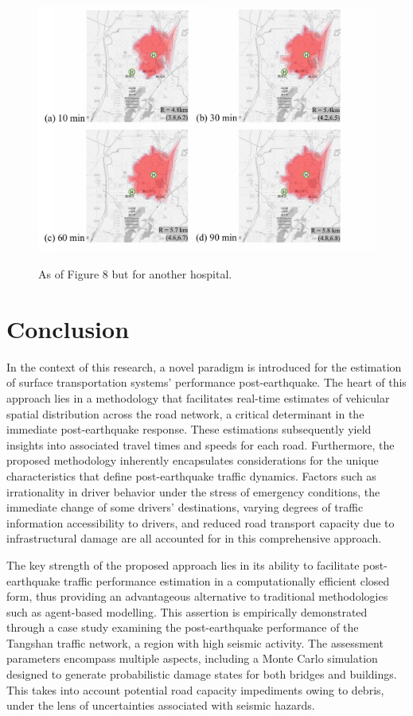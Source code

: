 \documentclass[review,11pt,nonatbib]{elsarticle}
\begin{document}
\begin{figure}[!htp]\centering
\includegraphics[width=12cm]{contour_hospital_2.pdf}\\
\caption{As of Figure 8 but for another hospital.}\label{fig9}
\end{figure}


\section{Conclusion}

In the context of this research, a novel paradigm is introduced for the estimation of surface transportation systems' performance post-earthquake. The heart of this approach lies in a methodology that facilitates real-time estimates of vehicular spatial distribution across the road network, a critical determinant in the immediate post-earthquake response. These estimations subsequently yield insights into associated travel times and speeds for each road. Furthermore, the proposed methodology inherently encapsulates considerations for the unique characteristics that define post-earthquake traffic dynamics. Factors such as irrationality in driver behavior under the stress of emergency conditions, the immediate change of some drivers' destinations, varying degrees of traffic information accessibility to drivers, and reduced road transport capacity due to infrastructural damage are all accounted for in this comprehensive approach.

The key strength of the proposed approach lies in its ability to facilitate post-earthquake traffic performance estimation in a computationally efficient closed form, thus providing an advantageous alternative to traditional methodologies such as agent-based modelling. This assertion is empirically demonstrated through a case study examining the post-earthquake performance of the Tangshan traffic network, a region with high seismic activity. The assessment parameters encompass multiple aspects, including a Monte Carlo simulation designed to generate probabilistic damage states for both bridges and buildings. This takes into account potential road capacity impediments owing to debris, under the lens of uncertainties associated with seismic hazards.
\end{document}
